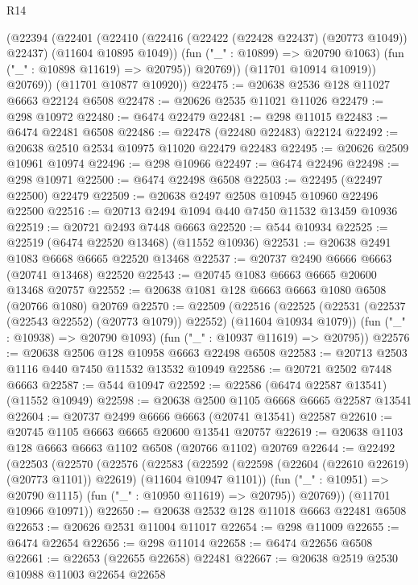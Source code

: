 \begin{lexlean}{R14}
\begin{coremodule}
              (@22394
                (@22401
                  (@22410
                    (@22416 (@22422 (@22428 @22437) (@20773 @1049)) @22437)
                    (@11604 @10895 @1049))
                  (fun ("_" : @10899) => @20790 @1063)
                  (fun ("_" : @10898 @11619) => @20795))
                @20769))
            (@11701 @10914 @10919))
          @20769))
      (@11701 @10877 @10920))
@22475 := @20638 @2536 @128 @11027 @6663 @22124 @6508
@22478 := @20626 @2535 @11021 @11026
@22479 := @298 @10972
@22480 := @6474 @22479
@22481 := @298 @11015
@22483 := @6474 @22481 @6508
@22486 := @22478 (@22480 @22483) @22124
@22492 := @20638 @2510 @2534 @10975 @11020 @22479 @22483
@22495 := @20626 @2509 @10961 @10974
@22496 := @298 @10966
@22497 := @6474 @22496
@22498 := @298 @10971
@22500 := @6474 @22498 @6508
@22503 := @22495 (@22497 @22500) @22479
@22509 := @20638 @2497 @2508 @10945 @10960 @22496 @22500
@22516 := @20713 @2494 @1094 @440 @7450 @11532 @13459 @10936
@22519 := @20721 @2493 @7448 @6663
@22520 := @544 @10934
@22525 := @22519 (@6474 @22520 @13468) (@11552 @10936)
@22531 := @20638 @2491 @1083 @6668 @6665 @22520 @13468
@22537 := @20737 @2490 @6666 @6663 (@20741 @13468) @22520
@22543 := @20745 @1083 @6663 @6665 @20600 @13468 @20757
@22552 := @20638 @1081 @128 @6663 @6663 @1080 @6508 (@20766 @1080) @20769
@22570 := @22509
    (@22516
      (@22525 (@22531 (@22537 (@22543 @22552) (@20773 @1079)) @22552) (@11604 @10934 @1079))
      (fun ("_" : @10938) => @20790 @1093)
      (fun ("_" : @10937 @11619) => @20795))
@22576 := @20638 @2506 @128 @10958 @6663 @22498 @6508
@22583 := @20713 @2503 @1116 @440 @7450 @11532 @13532 @10949
@22586 := @20721 @2502 @7448 @6663
@22587 := @544 @10947
@22592 := @22586 (@6474 @22587 @13541) (@11552 @10949)
@22598 := @20638 @2500 @1105 @6668 @6665 @22587 @13541
@22604 := @20737 @2499 @6666 @6663 (@20741 @13541) @22587
@22610 := @20745 @1105 @6663 @6665 @20600 @13541 @20757
@22619 := @20638 @1103 @128 @6663 @6663 @1102 @6508 (@20766 @1102) @20769
@22644 := @22492
    (@22503
      (@22570
        (@22576
          (@22583
            (@22592 (@22598 (@22604 (@22610 @22619) (@20773 @1101)) @22619) (@11604 @10947 @1101))
            (fun ("_" : @10951) => @20790 @1115)
            (fun ("_" : @10950 @11619) => @20795))
          @20769))
      (@11701 @10966 @10971))
@22650 := @20638 @2532 @128 @11018 @6663 @22481 @6508
@22653 := @20626 @2531 @11004 @11017
@22654 := @298 @11009
@22655 := @6474 @22654
@22656 := @298 @11014
@22658 := @6474 @22656 @6508
@22661 := @22653 (@22655 @22658) @22481
@22667 := @20638 @2519 @2530 @10988 @11003 @22654 @22658

\end{coremodule}
\end{lexlean}
